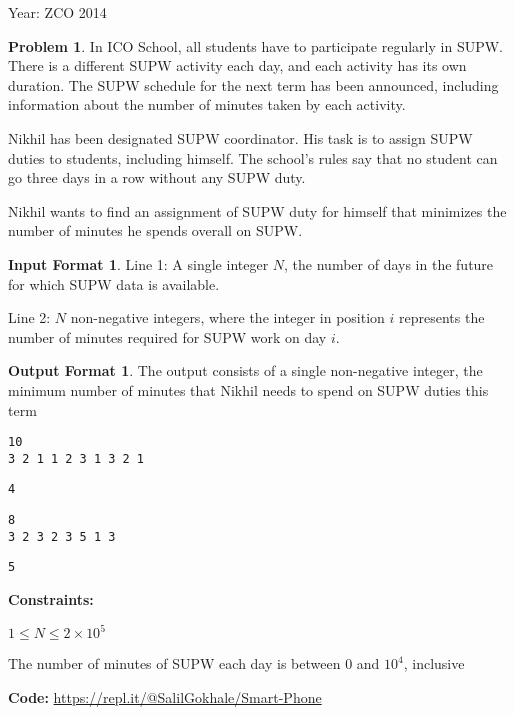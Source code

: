 \documentclass[twoside,12pt,a4paper,english]{book}
\theoremstyle{definition}
\theoremstyle{problemstyle}
\newtheorem*{problem}{Problem} %
\theoremstyle{problemstyle}
\newtheorem*{input_st}{Input Format} %
\theoremstyle{problemstyle}
\newtheorem*{output_st}{Output Format} %
\begin{document}
Year: ZCO 2014

\begin{problem}

In ICO School, all students have to participate regularly in SUPW. There is a different SUPW activity each day, and each activity has its own duration. The SUPW schedule for the next term has been announced, including information about the number of minutes taken by each activity.


Nikhil has been designated SUPW coordinator. His task is to assign SUPW duties to students, including himself. The school's rules say that no student can go three days in a row without any SUPW duty.


Nikhil wants to find an assignment of SUPW duty for himself that minimizes the number of minutes he spends overall on SUPW.

\end{problem}


\begin{input_st}

Line 1: A single integer $N$, the number of days in the future for which SUPW data is available.

Line 2: $N$ non-negative integers, where the integer in position $i$ represents the number of minutes required for SUPW work on day $i$.



\end{input_st}

\begin{output_st}

The output consists of a single non-negative integer, the minimum number of minutes that Nikhil needs to spend on SUPW duties this term

\end{output_st}

\begin{tcolorbox}[title=Example]
\begin{lstlisting}
10
3 2 1 1 2 3 1 3 2 1
\end{lstlisting}
\tcblower
\begin{lstlisting}
4
\end{lstlisting}
\end{tcolorbox}

\begin{tcolorbox}[title=Example]
\begin{lstlisting}
8
3 2 3 2 3 5 1 3
\end{lstlisting}
\tcblower
\begin{lstlisting}
5
\end{lstlisting}
\end{tcolorbox}

\textbf{Constraints:}
    
    $1 \leq N \leq 2\times 10^5$
    
    The number of minutes of SUPW each day is between $0$ and $10^4$, inclusive

\begin{tcolorbox}[title=Solution]

\textbf{Code: } \url{https://repl.it/@SalilGokhale/Smart-Phone}

\end{tcolorbox}

\newpage
\end{document}
